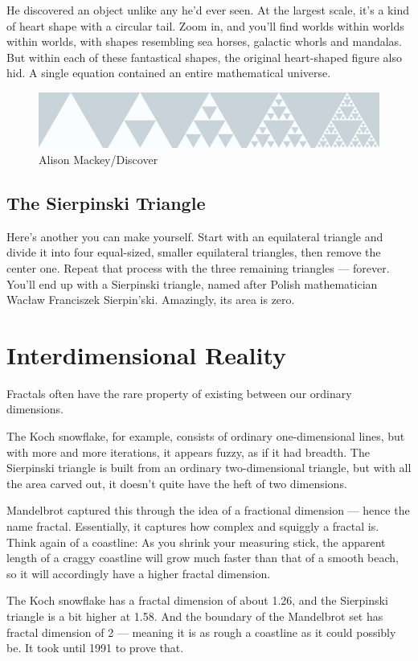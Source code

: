 \documentclass{article}
\begin{document}
He discovered an object unlike any he’d ever seen. At the largest scale, it’s a kind of heart shape with a circular tail. Zoom in, and you’ll find worlds within worlds within worlds, with shapes resembling sea horses, galactic whorls and mandalas. But within each of these fantastical shapes, the original heart-shaped figure also hid. A single equation contained an entire mathematical universe.
\begin{figure}[H]
\includegraphics[scale=0.43]{DSC-B0818_Sierpinski.jpg}
\caption{Alison Mackey/Discover}
\end{figure}
\subsection{The Sierpinski Triangle}
Here’s another you can make yourself. Start with an equilateral triangle and divide it into four equal-sized, smaller equilateral triangles, then remove the center one. Repeat that process with the three remaining triangles — forever. You’ll end up with a Sierpinski triangle, named after Polish mathematician Wacław Franciszek Sierpin’ski. Amazingly, its area is zero.
\section{Interdimensional Reality}
Fractals often have the rare property of existing between our ordinary dimensions.

The Koch snowflake, for example, consists of ordinary one-dimensional lines, but with more and more iterations, it appears fuzzy, as if it had breadth. The Sierpinski triangle is built from an ordinary two-dimensional triangle, but with all the area carved out, it doesn’t quite have the heft of two dimensions.

Mandelbrot captured this through the idea of a fractional dimension — hence the name fractal. Essentially, it captures how complex and squiggly a fractal is. Think again of a coastline: As you shrink your measuring stick, the apparent length of a craggy coastline will grow much faster than that of a smooth beach, so it will accordingly have a higher fractal dimension.

The Koch snowflake has a fractal dimension of about 1.26, and the Sierpinski triangle is a bit higher at 1.58. And the boundary of the Mandelbrot set has fractal dimension of 2 — meaning it is as rough a coastline as it could possibly be. It took until 1991 to prove that.
\end{document}

